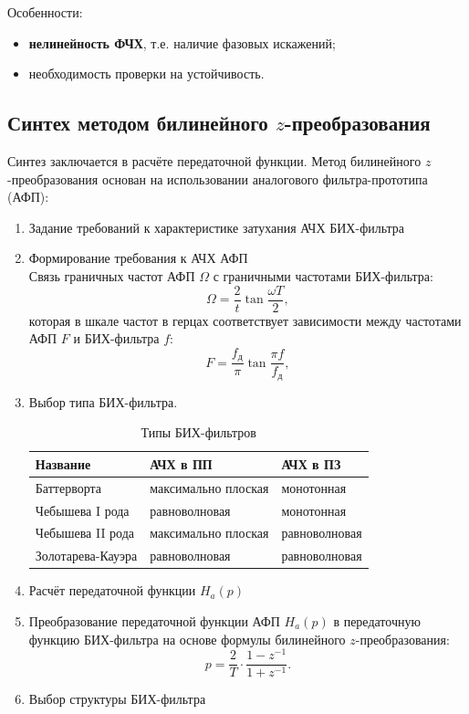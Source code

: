 \documentclass[a4paper, 14pt]{extarticle}
\begin{document}
Особенности:
\begin{itemize}
    \item \textbf{нелинейность ФЧХ}, т.е. наличие фазовых искажений;
    \item необходимость проверки на устойчивость.
\end{itemize}

\subsection{Синтех методом билинейного $z$-преобразования}
Синтез заключается в расчёте передаточной функции. Метод билинейного $z$-преобразования основан на использовании аналогового фильтра-прототипа (АФП):
\begin{enumerate}
    \item Задание требований к характеристике затухания АЧХ БИХ-фильтра
    \item Формирование требования к АЧХ АФП\\
        Связь граничных частот АФП $\Omega$ с граничными частотами БИХ-фильтра:
        \begin{equation}
            \Omega = \frac{2}{t} \tan \frac{\omega T}{2},
        \end{equation}
        которая в шкале частот в герцах соответствует зависимости между частотами АФП $F$ и БИХ-фильтра $f$:
        \begin{equation}
            F = \frac{f_\text{д}}{\pi} \tan \frac{\pi f}{f_\text{д}},
        \end{equation}
    \item Выбор типа БИХ-фильтра.\\
    \begin{table}[h]
    \centering
    \caption{Типы БИХ-фильтров}
    \begin{tabular}{@{}lll@{}}
    \toprule
    \textbf{Название} & \textbf{АЧХ в ПП}   & \textbf{АЧХ в ПЗ} \\ \midrule
    Баттерворта       & максимально плоская & монотонная        \\
    Чебышева I рода   & равноволновая       & монотонная        \\
    Чебышева II рода  & максимально плоская & равноволновая     \\
    Золотарева-Кауэра & равноволновая       & равноволновая     \\ \bottomrule
    \end{tabular}
    \end{table}
    \item Расчёт передаточной функции $H_a(p)$
    \item Преобразование передаточной функции АФП $H_a(p)$ в передаточную функцию БИХ-фильтра на основе формулы билинейного $z$-преобразования:
        \begin{equation}
            p = \frac{2}{T} \cdot \frac{1 - z^{-1}}{1 + z^{-1}}.
        \end{equation}
    \item Выбор структуры БИХ-фильтра
\end{enumerate}
\end{document}
